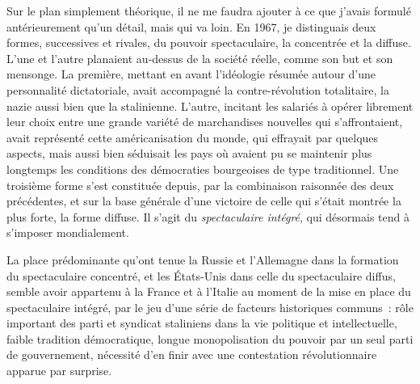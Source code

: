 \documentclass[french,twoside]{book} %
\begin{document}
\noindent Sur le plan simplement théorique, il ne me faudra ajouter à ce que j’avais formulé antérieurement qu’un détail, mais qui va loin. En 1967, je distinguais deux formes, successives et rivales, du pouvoir spectaculaire, la concentrée et la diffuse. L’une et l’autre planaient au-dessus de la société réelle, comme son but et son mensonge. La première, mettant en avant l’idéologie résumée autour d’une personnalité dictatoriale, avait accompagné la contre-révolution totalitaire, la nazie aussi bien que la stalinienne. L’autre, incitant les salariés à opérer librement leur choix entre une grande variété de marchandises nouvelles qui s’affrontaient, avait représenté cette américanisation du monde, qui effrayait par quelques aspects, mais aussi bien séduisait les pays où avaient pu se maintenir plus longtemps les conditions des démocraties bourgeoises de type traditionnel. Une troisième forme s’est constituée depuis, par la combinaison raisonnée des deux précédentes, et sur la base générale d’une victoire de celle qui s’était montrée la plus forte, la forme diffuse. Il s’agit du \emph{spectaculaire intégré}, qui désormais tend à s’imposer mondialement.\par
La place prédominante qu’ont tenue la Russie et l’Allemagne dans la formation du spectaculaire concentré, et les États-Unis dans celle du spectaculaire diffus, semble avoir appartenu à la France et à l’Italie au moment de la mise en place du spectaculaire intégré, par le jeu d’une série de facteurs historiques communs : rôle important des parti et syndicat staliniens dans la vie politique et intellectuelle, faible tradition démocratique, longue monopolisation du pouvoir par un seul parti de gouvernement, nécessité d’en finir avec une contestation révolutionnaire apparue par surprise.\par
\end{document}
